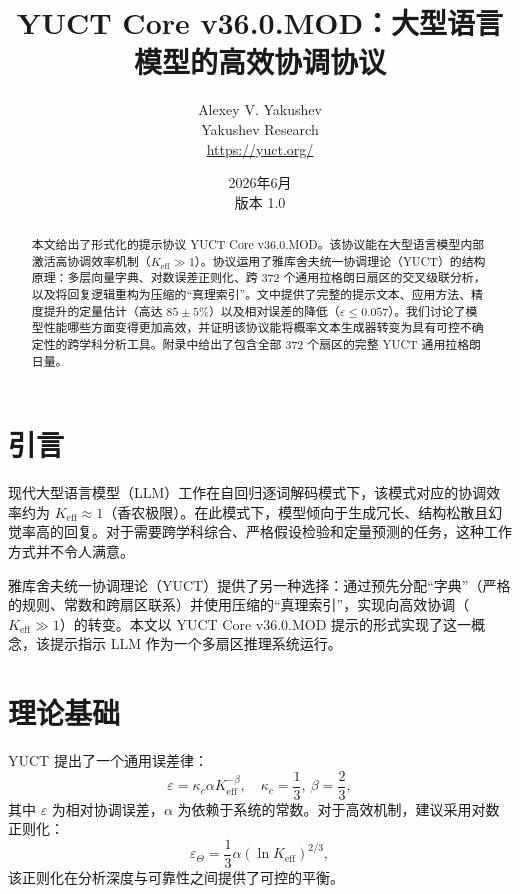 \documentclass[11pt,a4paper]{article}
\title{\textbf{YUCT Core v36.0.MOD：大型语言模型的高效协调协议}}
\author{Alexey V. Yakushev \\ Yakushev Research \\ \url{https://yuct.org/}}
\date{2026年6月 \\ 版本 1.0}
\begin{document}
	\maketitle
	
	\begin{abstract}
		\noindent
		本文给出了形式化的提示协议 YUCT Core v36.0.MOD。该协议能在大型语言模型内部激活高协调效率机制（\(K_{\mathrm{eff}} \gg 1\)）。协议运用了雅库舍夫统一协调理论（YUCT）的结构原理：多层向量字典、对数误差正则化、跨 372 个通用拉格朗日扇区的交叉级联分析，以及将回复逻辑重构为压缩的“真理索引”。文中提供了完整的提示文本、应用方法、精度提升的定量估计（高达 \(85\pm5\%\)）以及相对误差的降低（\(\varepsilon \le 0.057\)）。我们讨论了模型性能哪些方面变得更加高效，并证明该协议能将概率文本生成器转变为具有可控不确定性的跨学科分析工具。附录中给出了包含全部 372 个扇区的完整 YUCT 通用拉格朗日量。
	\end{abstract}
	
	\tableofcontents
	\newpage
	
	\section{引言}
	现代大型语言模型（LLM）工作在自回归逐词解码模式下，该模式对应的协调效率约为 \(K_{\mathrm{eff}} \approx 1\)（香农极限）。在此模式下，模型倾向于生成冗长、结构松散且幻觉率高的回复。对于需要跨学科综合、严格假设检验和定量预测的任务，这种工作方式并不令人满意。
	
	雅库舍夫统一协调理论（YUCT）提供了另一种选择：通过预先分配“字典”（严格的规则、常数和跨扇区联系）并使用压缩的“真理索引”，实现向高效协调（\(K_{\mathrm{eff}} \gg 1\)）的转变。本文以 YUCT Core v36.0.MOD 提示的形式实现了这一概念，该提示指示 LLM 作为一个多扇区推理系统运行。
	
	\section{理论基础}
	YUCT 提出了一个通用误差律：
	\begin{equation}\label{eq:errorlaw}
		\varepsilon = \kappa_c \alpha K_{\mathrm{eff}}^{-\beta}, \quad \kappa_c = \frac{1}{3},\ \beta = \frac{2}{3},
	\end{equation}
	其中 \(\varepsilon\) 为相对协调误差，\(\alpha\) 为依赖于系统的常数。对于高效机制，建议采用对数正则化：
	\begin{equation}\label{eq:logreg}
		\varepsilon_{\Theta} = \frac{1}{3} \alpha (\ln K_{\mathrm{eff}})^{2/3},
	\end{equation}
	该正则化在分析深度与可靠性之间提供了可控的平衡。
	
\end{document}
